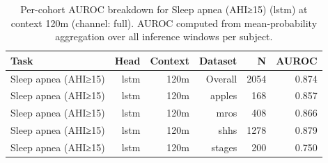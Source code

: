 \begin{table}[ht]
\centering
\caption{Per-cohort AUROC breakdown for Sleep apnea (AHI≥15) (lstm) at context 120m (channel: full). AUROC computed from mean-probability aggregation over all inference windows per subject.}
\label{tab:cohort_apnea_binary_lstm_full}
\begin{tabular}{lrrrrr}
\toprule
Task & Head & Context & Dataset & N & AUROC \\
\midrule
Sleep apnea (AHI≥15) & lstm & 120m & Overall & 2054 & 0.874 \\
Sleep apnea (AHI≥15) & lstm & 120m & apples & 168 & 0.857 \\
Sleep apnea (AHI≥15) & lstm & 120m & mros & 408 & 0.866 \\
Sleep apnea (AHI≥15) & lstm & 120m & shhs & 1278 & 0.879 \\
Sleep apnea (AHI≥15) & lstm & 120m & stages & 200 & 0.750 \\
\bottomrule
\end{tabular}
\end{table}
